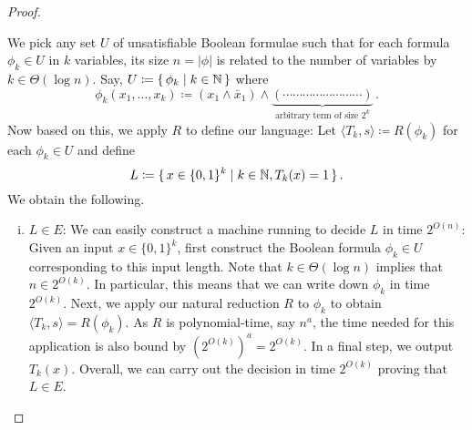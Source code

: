 \documentclass[12pt]{article}
\theoremstyle{definition}
\begin{document}
\begin{proof}
\begin{enumerate}[-]
\begin{enumerate} [+]
      We pick any set $U$ of unsatisfiable Boolean formulae such that for each
      formula $\phi_k \in U$ in $k$ variables, its size $n = |\phi|$ is related
      to the number of variables by $k \in \Theta(\log n)$. Say,
      $U \coloneqq \{\, { \phi_k \mid k \in {\mathbb{N}} } \,\}$
      where
      \[
        \phi_k(x_1, \dots, x_k) \coloneqq
        (x_1 \land \bar x_1) \land
        \underbrace{(\cdots \cdots\cdots \cdots \cdots \cdots\cdots \cdots)}_{
          \textrm{arbitrary term of size $2^k$}} \,.
      \]
      Now based on this, we apply $R$ to define our language: Let
      $\langle T_k, s \rangle \coloneqq R(\phi_k)$ for each $\phi_k \in U$
      and define
      \[
        L \coloneqq
        \{\, {
          x \in \{0,1\}^k \mid
          k \in {\mathbb{N}},
          T_k(x) = 1
        } \,\} \,.
      \]
      We obtain the following.
      \begin{enumerate}[(i)]
        \item $L \in E$:
          We can easily construct a machine running to decide $L$ in time
          $2^{O(n)}$: Given an input $x \in \{0,1\}^k$, first construct the
          Boolean formula $\phi_k \in U$ corresponding to this input length.
          Note that $k \in \Theta(\log n)$ implies
          that $n \in 2^{O(k)}$. %
          In particular, this means that we can write down $\phi_k$ in time
          $2^{O(k)}$.
          Next, we apply our natural reduction $R$ to $\phi_k$ to obtain
          $\langle T_k, s \rangle = R(\phi_k)$.
          As $R$ is polynomial-time, say $n^a$, the time needed for this
          application is also bound by $(2^{O(k)})^a = 2^{O(k)}$.
          In a final step, we output $T_k(x)$.
          Overall, we can carry out the decision in time $2^{O(k)}$ proving
          that $L \in E$.


\end{enumerate}
\end{enumerate}
\end{enumerate}
\end{proof}
\end{document}
